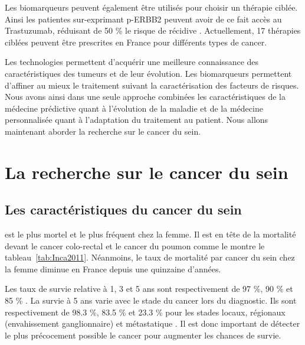       Les biomarqueurs peuvent également être utilisés pour choisir un thérapie ciblée.
      Ainsi les patientes sur-exprimant \acs{p-ERBB2} peuvent avoir de ce fait accès au Trastuzumab, réduisant de 50 \% le risque de récidive \citep{Hudis2007}.
      Actuellement, 17 thérapies ciblées peuvent être prescrites en France pour différents types de cancer.

      Les technologies permettent d'acquérir une meilleure connaissance des caractéristiques des tumeurs et de leur évolution.
      Les biomarqueurs permettent d'affiner au mieux le traitement suivant la caractérisation des facteurs de risques.
      Nous avons ainsi dans une seule approche combinées les caractéristiques de la médecine prédictive quant à l'évolution de la maladie et de la médecine personnalisée quant à l'adaptation du traitement au patient.
      Nous allons maintenant aborder la recherche sur le cancer du sein.

  \section{\textcolor{myred}{La recherche sur le cancer du sein}}\label{Sec:RechercheBC}

    \subsection{\textcolor{myred}{Les caractéristiques du cancer du sein}}
       est le plus mortel et le plus fréquent chez la femme.
      Il est en tête de la mortalité devant le cancer colo-rectal et le cancer du poumon comme le montre le tableau~\ref{tab:Inca2011}.
      Néanmoins, le taux de mortalité par cancer du sein chez la femme diminue en France depuis une quinzaine d'années.

      Les taux de survie relative à 1, 3 et 5 ans sont respectivement de 97 \%, 90 \% et 85 \% \citep{Inca2011}.
      La survie à 5 ans varie avec le stade du cancer lors du diagnostic.
      Ils sont respectivement de 98.3 \%, 83.5 \% et 23.3 \% pour les stades locaux, régionaux (envahissement ganglionnaire) et métastatique \citep{SEER2011}.
      Il est donc important de détecter le plus précocement possible le cancer pour augmenter les chances de survie.

